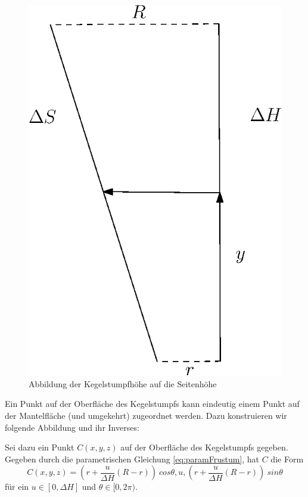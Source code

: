 \begin{figure}[!htb]
	\centering
	\includegraphics[scale=.7]{images/mapToLateralS.eps}
	\caption{Abbildung der Kegelstumpfhöhe auf die Seitenhöhe}
	\label{fig:mapToLateralS}
\end{figure}

\bigskip

Ein Punkt auf der Oberfläche des Kegelstumpfs kann eindeutig einem Punkt auf der Mantelfläche (und umgekehrt) zugeordnet werden. Dazu konstruieren wir folgende Abbildung und ihr Inverses:

Sei dazu ein Punkt $C(x,y,z)$ auf der Oberfläche des Kegelstumpfs gegeben. Gegeben durch die parametrischen Gleichung \ref{eq:paramFrustum}, hat $C$ die Form
\[
C(x,y,z) = (r + \frac{u}{\Delta H} (R - r))~cos \theta, u, (r + \frac{u}{\Delta H} (R - r))~sin \theta
\]  für ein $u\in [0, \Delta H]$ und $\theta \in [0, 2\pi)$.

